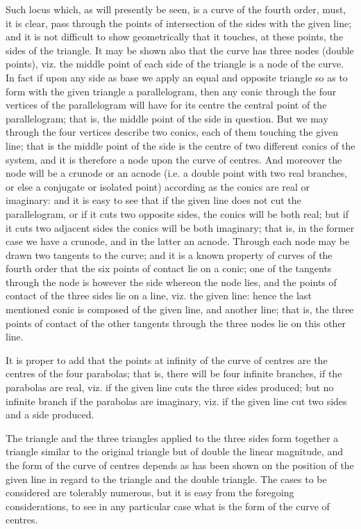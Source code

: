 \documentclass[11pt,a4paper]{article}
\theoremstyle{definition}
\begin{document}
Such locus which, as will presently be seen, is a curve of the fourth order, must,
it is clear, pass through the points of intersection of the sides with the given line; and
it is not difficult to show geometrically that it touches, at these points, the sides of the
triangle. It may be shown also that the curve has three nodes (double points), viz.
the middle point of each side of the triangle is a node of the curve. In fact if upon
any side as base we apply an equal and opposite triangle so as to form with the
given triangle a parallelogram, then any conic through the four vertices of the
parallelogram will have for its centre the central point of the parallelogram; that
is, the middle point of the side in question. But we may through the four vertices
describe two conics, each of them touching the given line; that is the middle point
of the side is the centre of two different conics of the system, and it is therefore a
node upon the curve of centres. And moreover the node will be a crunode or an
acnode (i.e. a double point with two real branches, or else a conjugate or isolated
point) according as the conics are real or imaginary: and it is easy to see that
if the given line does not cut the parallelogram, or if it cuts two opposite sides,
the conics will be both real; but if it cuts two adjacent sides the conics will be
both imaginary; that is, in the former case we have a crunode, and in the latter an
acnode. Through each node may be drawn two tangents to the curve; and it is a
known property of curves of the fourth order that the six points of contact lie on
a conic; one of the tangents through the node is however the side whereon the node
lies, and the points of contact of the three sides lie on a line, viz. the given line:
hence the last mentioned conic is composed of the given line, and another line;
that is, the three points of contact of the other tangents through the three nodes lie on
this other line.

It is proper to add that the points at infinity of the curve of centres are the
centres of the four parabolas; that is, there will be four infinite branches, if the
parabolas are real, viz. if the given line cuts the three sides produced; but no infinite
branch if the parabolas are imaginary, viz. if the given line cut two sides and a side
produced.

The triangle and the three triangles applied to the three sides form together a
triangle similar to the original triangle but of double the linear magnitude, and the
form of the curve of centres depends as has been shown on the position of the given
line in regard to the triangle and the double triangle. The cases to be considered
are tolerably numerous, but it is easy from the foregoing considerations, to see in any
particular case what is the form of the curve of centres.
\end{document}
